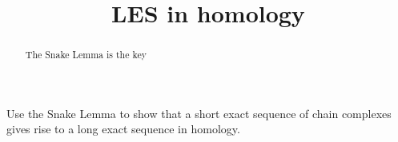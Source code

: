 \documentclass{ximera}
\title{LES in homology}
\begin{document}
\begin{abstract}
The Snake Lemma is the key
\end{abstract}
\maketitle

Use the Snake Lemma to show that a short exact sequence of chain
complexes gives rise to a long exact sequence in homology.
\end{document}
